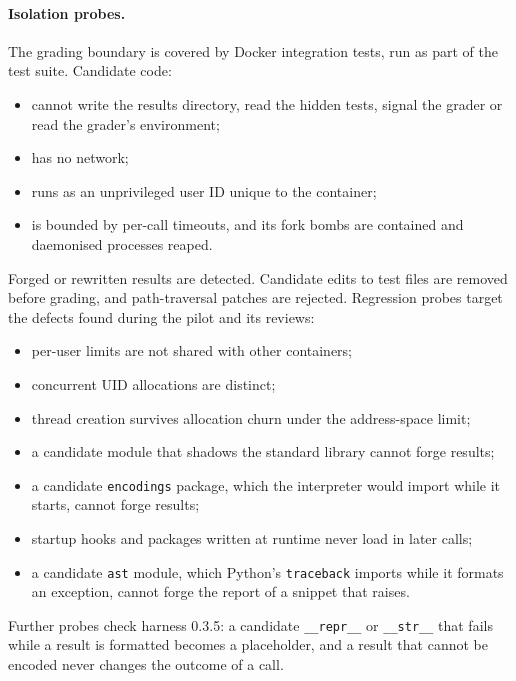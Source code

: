 \paragraph{Isolation probes.} The grading boundary is covered by Docker integration tests, run as part of the test
suite. Candidate code:
\begin{itemize}
\item cannot write the results directory, read the hidden tests, signal the grader or read the grader's environment;
\item has no network;
\item runs as an unprivileged user ID unique to the container;
\item is bounded by per-call timeouts, and its fork bombs are contained and daemonised processes reaped.
\end{itemize}
Forged or rewritten results are detected. Candidate edits to test files are removed before grading, and path-traversal
patches are rejected. Regression probes target the defects found during the pilot and its reviews:
\begin{itemize}
\item per-user limits are not shared with other containers;
\item concurrent UID allocations are distinct;
\item thread creation survives allocation churn under the address-space limit;
\item a candidate module that shadows the standard library cannot forge results;
\item a candidate \texttt{encodings} package, which the interpreter would import while it starts, cannot forge results;
\item startup hooks and packages written at runtime never load in later calls;
\item a candidate \texttt{ast} module, which Python's \texttt{traceback} imports while it formats an exception, cannot
  forge the report of a snippet that raises.
\end{itemize}
Further probes check harness 0.3.5: a candidate \texttt{\_\_repr\_\_} or \texttt{\_\_str\_\_} that fails while a result
is formatted becomes a placeholder, and a result that cannot be encoded never changes the outcome of a call.

